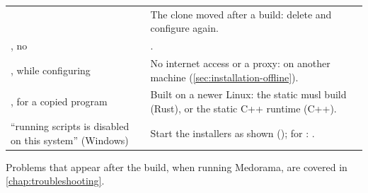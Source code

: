 \begin{xltabular}{\linewidth}{@{}P{5.4cm}L@{}}
 & The clone moved after a
  build: delete  and configure again. \\
, no  &
  . \\
,  while configuring & No internet access or a
  proxy:  on another machine (\cref{sec:installation-offline}). \\
,  for a copied program &
  Built on a newer Linux: the static musl build (Rust), or the static C++ runtime (C++). \\
``running scripts is disabled on this system'' (Windows) & Start the installers as shown
  (); for :
  . \\
\end{xltabular}

Problems that appear after the build, when running Medorama, are covered in
\cref{chap:troubleshooting}.
